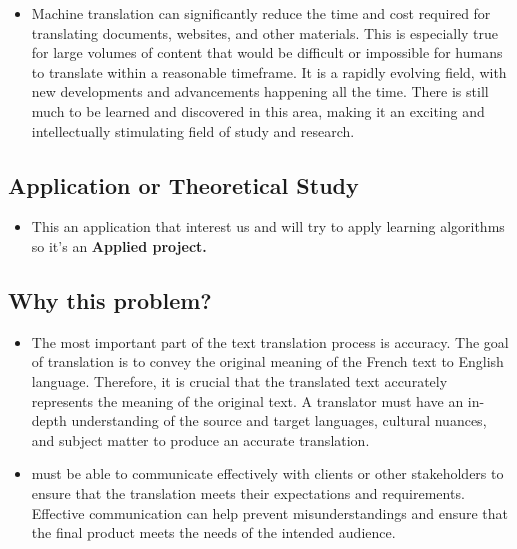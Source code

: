 \documentclass{article}
\begin{document}
    \begin{itemize}
        \item Machine translation can significantly reduce the time and cost required for translating documents, websites, and other materials. This is especially true for large volumes of content that would be difficult or impossible for humans to translate within a reasonable timeframe. It is a rapidly evolving field, with new developments and advancements happening all the time. There is still much to be learned and discovered in this area, making it an exciting and intellectually stimulating field of study and research.
    \end{itemize}


\subsection{ Application or Theoretical Study}
\begin{itemize}
    \item This an application that interest us and will try to apply learning algorithms so it's an \textbf{Applied project.}~\cite{brown1988statistical}
\end{itemize}

 \subsection{Why this problem? }
 
\begin{itemize}
    \item The most important part of the text translation process is accuracy. The goal of translation is to convey the original meaning of the French text to English language. Therefore, it is crucial that the translated text accurately represents the meaning of the original text. A translator must have an in-depth understanding of the source and target languages, cultural nuances, and subject matter to produce an accurate translation. 
\end{itemize}

 \begin{itemize}
     \item must be able to communicate effectively with clients or other stakeholders to ensure that the translation meets their expectations and requirements. Effective communication can help prevent misunderstandings and ensure that the final product meets the needs of the intended audience.
 \end{itemize}
\end{document}

